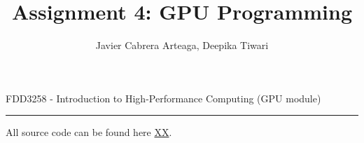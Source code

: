 \documentclass[12pt]{article}
\begin{document}
 
 
\title{Assignment 4: GPU Programming} %
\author{Javier Cabrera Arteaga, Deepika Tiwari} %
 
\maketitle


{%
\centering
FDD3258 - Introduction to High-Performance Computing (GPU module)
\par
}
\hrule
\vspace{.2in}

All source code can be found here \url{XX}.
\end{document}

